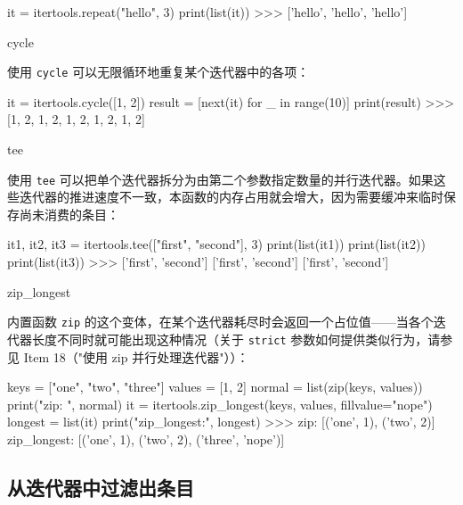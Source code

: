 \begin{codebox}[python]
it = itertools.repeat("hello", 3)
print(list(it))
>>>
['hello', 'hello', 'hello']
\end{codebox}

\begin{codebox}[python]
cycle
\end{codebox}

使用 \texttt{cycle} 可以无限循环地重复某个迭代器中的各项：

\begin{codebox}[python]
it = itertools.cycle([1, 2])
result = [next(it) for _ in range(10)]
print(result)
>>>
[1, 2, 1, 2, 1, 2, 1, 2, 1, 2]
\end{codebox}

\begin{codebox}[python]
tee
\end{codebox}

使用 \texttt{tee} 可以把单个迭代器拆分为由第二个参数指定数量的并行迭代器。如果这些迭代器的推进速度不一致，本函数的内存占用就会增大，因为需要缓冲来临时保存尚未消费的条目：

\begin{codebox}[python]
it1, it2, it3 = itertools.tee(["first", "second"], 3)
print(list(it1))
print(list(it2))
print(list(it3))
>>>
['first', 'second']
['first', 'second']
['first', 'second']
\end{codebox}

\begin{codebox}[python]
zip_longest
\end{codebox}

内置函数 \texttt{zip} 的这个变体，在某个迭代器耗尽时会返回一个占位值——当各个迭代器长度不同时就可能出现这种情况（关于 \texttt{strict} 参数如何提供类似行为，请参见 Item 18（"使用 zip 并行处理迭代器"））：

\begin{codebox}[python]
keys = ["one", "two", "three"]
values = [1, 2]
normal = list(zip(keys, values))
print("zip:        ", normal)
it = itertools.zip_longest(keys, values, fillvalue="nope")
longest = list(it)
print("zip_longest:", longest)
>>>
zip:         [('one', 1), ('two', 2)]
zip_longest: [('one', 1), ('two', 2), ('three', 'nope')]
\end{codebox}

\subsection{从迭代器中过滤出条目}

